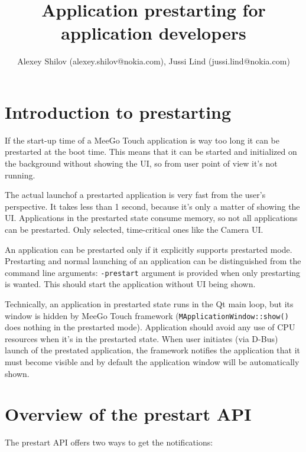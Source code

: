 \documentclass[a4paper]{article}
\title{Application prestarting for application developers}
\author{Alexey Shilov (alexey.shilov@nokia.com), Jussi Lind (jussi.lind@nokia.com)}
\begin{document}
\maketitle

\section{Introduction to prestarting}

If the start-up time of a MeeGo Touch application is way too long it can be prestarted at the boot time. 
This means that it can be started and initialized on the background without showing the UI, so from user point of view it's not running. 

The actual launchof a prestarted application is very fast from
the user's perspective. It takes less than 1 second, because it's only a matter of showing the UI. 
Applications in the prestarted state consume memory, so not all applications can be prestarted. 
Only selected, time-critical ones like the Camera UI.

An application can be prestarted only if it explicitly supports prestarted mode.
Prestarting and normal launching of an application can be distinguished
from the command line arguments: \texttt{-prestart} argument is provided when
only prestarting is wanted. This should start the application without UI being shown.

Technically, an application in prestarted state runs in the Qt main loop, but its
window is hidden by MeeGo Touch framework (\texttt{MApplicationWindow::show()} does
nothing in the prestarted mode). Application should avoid any use of CPU resources 
when it's in the prestarted state. When user initiates (via D-Bus) launch of the prestated 
application, the framework notifies the application that it must become visible 
and by default the application window will be automatically shown.

\section{Overview of the prestart API}

The prestart API offers two ways to get the notifications:
\end{document}

